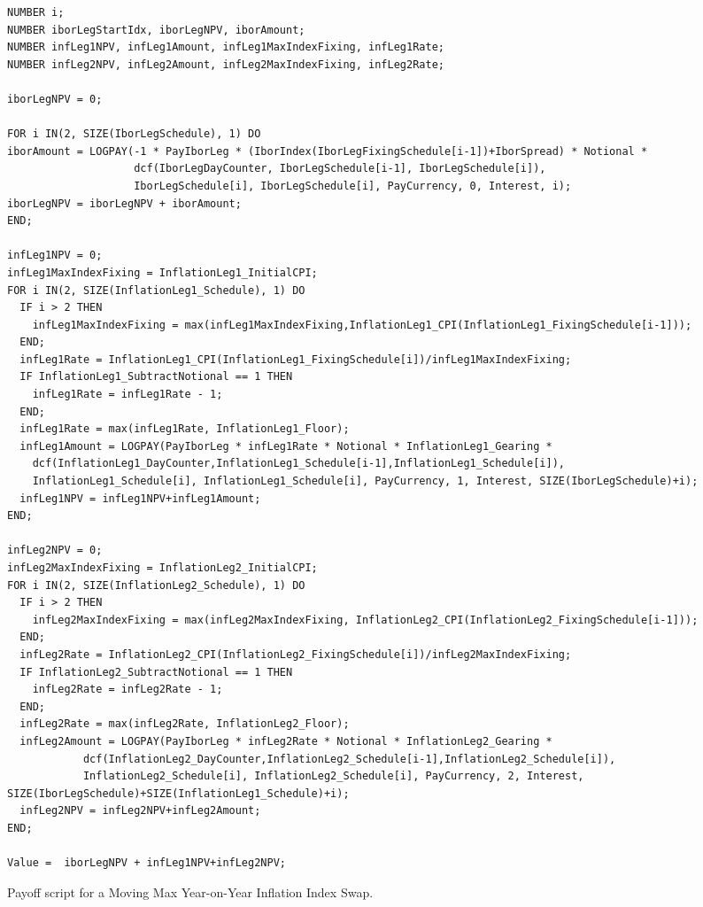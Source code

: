 \begin{listing}[hbt]
  \begin{verbatim} 
NUMBER i;
NUMBER iborLegStartIdx, iborLegNPV, iborAmount;
NUMBER infLeg1NPV, infLeg1Amount, infLeg1MaxIndexFixing, infLeg1Rate;
NUMBER infLeg2NPV, infLeg2Amount, infLeg2MaxIndexFixing, infLeg2Rate;

iborLegNPV = 0;

FOR i IN(2, SIZE(IborLegSchedule), 1) DO
iborAmount = LOGPAY(-1 * PayIborLeg * (IborIndex(IborLegFixingSchedule[i-1])+IborSpread) * Notional * 
                    dcf(IborLegDayCounter, IborLegSchedule[i-1], IborLegSchedule[i]),
                    IborLegSchedule[i], IborLegSchedule[i], PayCurrency, 0, Interest, i);
iborLegNPV = iborLegNPV + iborAmount;
END;

infLeg1NPV = 0;
infLeg1MaxIndexFixing = InflationLeg1_InitialCPI;
FOR i IN(2, SIZE(InflationLeg1_Schedule), 1) DO
  IF i > 2 THEN 
    infLeg1MaxIndexFixing = max(infLeg1MaxIndexFixing,InflationLeg1_CPI(InflationLeg1_FixingSchedule[i-1]));
  END;
  infLeg1Rate = InflationLeg1_CPI(InflationLeg1_FixingSchedule[i])/infLeg1MaxIndexFixing;
  IF InflationLeg1_SubtractNotional == 1 THEN
    infLeg1Rate = infLeg1Rate - 1;
  END;
  infLeg1Rate = max(infLeg1Rate, InflationLeg1_Floor);
  infLeg1Amount = LOGPAY(PayIborLeg * infLeg1Rate * Notional * InflationLeg1_Gearing * 
    dcf(InflationLeg1_DayCounter,InflationLeg1_Schedule[i-1],InflationLeg1_Schedule[i]),
    InflationLeg1_Schedule[i], InflationLeg1_Schedule[i], PayCurrency, 1, Interest, SIZE(IborLegSchedule)+i);
  infLeg1NPV = infLeg1NPV+infLeg1Amount;
END;

infLeg2NPV = 0;
infLeg2MaxIndexFixing = InflationLeg2_InitialCPI;
FOR i IN(2, SIZE(InflationLeg2_Schedule), 1) DO
  IF i > 2 THEN 
    infLeg2MaxIndexFixing = max(infLeg2MaxIndexFixing, InflationLeg2_CPI(InflationLeg2_FixingSchedule[i-1]));
  END;
  infLeg2Rate = InflationLeg2_CPI(InflationLeg2_FixingSchedule[i])/infLeg2MaxIndexFixing;
  IF InflationLeg2_SubtractNotional == 1 THEN
    infLeg2Rate = infLeg2Rate - 1;
  END;
  infLeg2Rate = max(infLeg2Rate, InflationLeg2_Floor);
  infLeg2Amount = LOGPAY(PayIborLeg * infLeg2Rate * Notional * InflationLeg2_Gearing * 
            dcf(InflationLeg2_DayCounter,InflationLeg2_Schedule[i-1],InflationLeg2_Schedule[i]),
            InflationLeg2_Schedule[i], InflationLeg2_Schedule[i], PayCurrency, 2, Interest, SIZE(IborLegSchedule)+SIZE(InflationLeg1_Schedule)+i);
  infLeg2NPV = infLeg2NPV+infLeg2Amount;
END;

Value =  iborLegNPV + infLeg1NPV+infLeg2NPV;
\end{verbatim}
  \caption{Payoff script for a Moving Max Year-on-Year Inflation Index Swap.}
  \label{lst:movingMaxYYIIS}
\end{listing}

